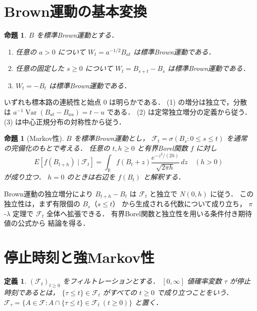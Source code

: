 \documentclass[a5paper,10pt,onecolumn]{jsarticle}
\makeatletter
\theoremstyle{mathnotetheorem}
\newtheorem{definition}[theorem]{定義}
\newtheorem{proposition}[theorem]{命題}
\renewcommand{\proofname}{証明}
\renewenvironment{proof}[1][\proofname]{%
  \par\pushQED{\qed}\normalfont\topsep4\p@\@plus2\p@\relax
  \trivlist\item[\hskip\labelsep\bfseries #1]\ignorespaces
}{\popQED\endtrivlist\@endpefalse}
\makeatother
\begin{document}
\section{Brown運動の基本変換}

\begin{proposition}\label{prop:scaling}
$B$ を標準Brown運動とする．
\begin{enumerate}
\item 任意の $a>0$ について
$W_t=a^{-1/2}B_{at}$ は標準Brown運動である．
\item 任意の固定した $s\ge0$ について
$W_t=B_{s+t}-B_s$ は標準Brown運動である．
\item $W_t=-B_t$ は標準Brown運動である．
\end{enumerate}
\end{proposition}
\begin{proof}
いずれも標本路の連続性と始点 $0$ は明らかである．
(1) の増分は独立で，分散は
$a^{-1}\operatorname{Var}(B_{at}-B_{au})=t-u$ である．
(2) は定常独立増分の定義から従う．
(3) は中心正規分布の対称性から従う．
\end{proof}

\begin{proposition}[Markov性]\label{prop:markov}
$B$ を標準Brown運動とし，
$\mathcal F_t=\sigma(B_s:0\le s\le t)$
を通常の完備化のもとで考える．
任意の $t,h\ge0$ と有界Borel関数 $f$ に対し
\[
 E[f(B_{t+h})\mid\mathcal F_t]
 =\int_{\mathbb R}f(B_t+z)
   \frac{e^{-z^2/(2h)}}{\sqrt{2\pi h}}\,dz
 \quad(h>0)
\]
が成り立つ．
$h=0$ のときは右辺を $f(B_t)$ と解釈する．
\end{proposition}
\begin{proof}
Brown運動の独立増分により
$B_{t+h}-B_t$ は $\mathcal F_t$ と独立で
$N(0,h)$ に従う．
この独立性は，まず有限個の $B_s$（$s\le t$）
から生成される代数について成り立ち，
$\pi$-$\lambda$ 定理で $\mathcal F_t$ 全体へ拡張できる．
有界Borel関数と独立性を用いる条件付き期待値の公式から
結論を得る．
\end{proof}

\section{停止時刻と強Markov性}

\begin{definition}
$(\mathcal F_t)_{t\ge0}$ をフィルトレーションとする．
$[0,\infty]$ 値確率変数 $\tau$ が停止時刻であるとは，
$\{\tau\le t\}\in\mathcal F_t$ がすべての $t\ge0$ で成り立つことをいう．
$\mathcal F_\tau
=\{A\in\mathcal F:A\cap\{\tau\le t\}\in\mathcal F_t
 \ (t\ge0)\}$ と置く．
\end{definition}
\end{document}
